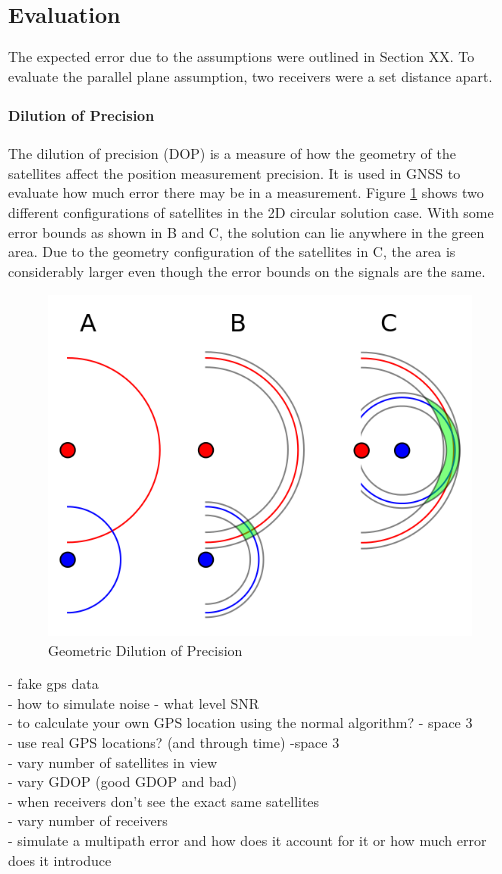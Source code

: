 \subsection{Evaluation} %
The expected error due to the assumptions were outlined in Section XX. To evaluate the parallel plane assumption, two receivers were a set distance apart.


\paragraph{Dilution of Precision}
The dilution of precision (DOP) is a measure of how the geometry of the satellites affect the position measurement precision. It is used in GNSS to evaluate how much error there may be in a measurement. Figure \ref{Fig: GDOP abstract} shows two different configurations of satellites in the 2D circular solution case. With some error bounds as shown in B and C, the solution can lie anywhere in the green area. Due to the geometry configuration of the satellites in C, the area is considerably larger even though the error bounds on the signals are the same.

\begin{figure}
\centering
\caption{Geometric Dilution of Precision}
\label{Fig: GDOP abstract}
\includegraphics[width=0.7\linewidth]{ChapterExperiments/Figures/GDOP.png}
\end{figure}




- fake gps data\\
- how to simulate noise - what level SNR\\
- to calculate your own GPS location using the normal algorithm? - space 3 \\
- use real GPS locations? (and through time) -space 3\\
- vary number of satellites in view\\
- vary GDOP (good GDOP and bad)\\
- when receivers don't see the exact same satellites \\
- vary number of receivers \\
- simulate a multipath error and how does it account for it or how much error does it introduce\\

